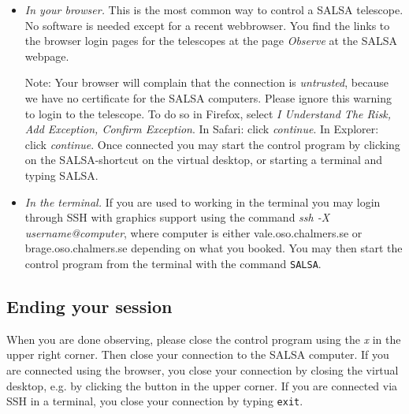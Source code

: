 \begin{itemize}
	\item{\emph{In your browser.} This is the most common way to control a
			SALSA telescope. No software is needed except for a recent 
			webbrowser. You find the links to the browser login pages for
			the telescopes at the page \emph{Observe} at the SALSA webpage.
			
		Note: Your browser will complain that the connection is \emph{untrusted},
			because we have no certificate for the SALSA computers. Please
			ignore this warning to login to the telescope. To do so in Firefox,
			select \emph{I Understand The Risk, Add Exception, Confirm
			Exception}. In Safari: click \emph{continue}. In Explorer: click
			\emph{continue}.  Once connected you may start the control program by
			clicking on the SALSA-shortcut on the virtual desktop, or starting
		a terminal and typing SALSA. }

\item{\emph{In the terminal.} If you are used to working in the terminal you
		may login through SSH with graphics support using the command \emph{ssh
		-X username@computer}, where computer is either vale.oso.chalmers.se or
		brage.oso.chalmers.se depending on what you booked.  You may then start
		the control program from the terminal with the command {\tt  SALSA}.}
\end{itemize}

\subsection{Ending your session}
When you are done observing, please close the control program using the
\emph{x} in the upper right corner. Then close your connection to the SALSA
computer. If you are connected using the browser, you close your connection by
closing the virtual desktop, e.g. by clicking the button in the upper corner. 
If you are connected via SSH in a terminal, you close your connection by 
typing {\tt exit}.

